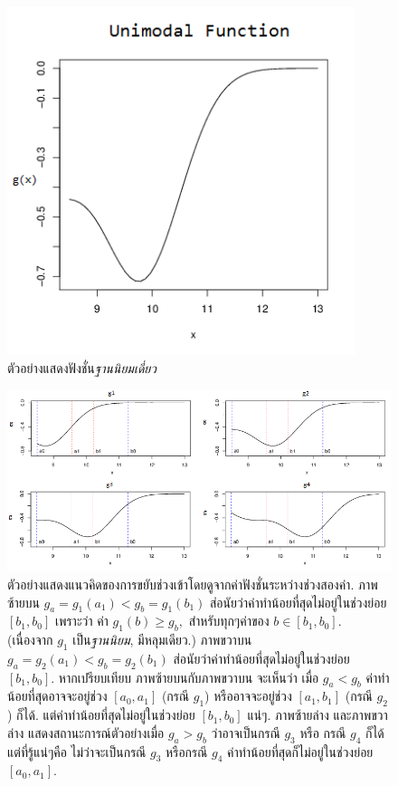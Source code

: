 %
\begin{figure}
\begin{center}
\includegraphics[width=4.0in]
{02Background/unimodal.png}
\end{center}
\caption{ตัวอย่างแสดงฟังชั่น\textit{ฐานนิยมเดี่ยว}}
\label{fig: unimodal}
\end{figure}
%

%
\begin{figure}
\begin{center}
\includegraphics[width=6.0in]
{02Background/goldenSectionIdea.png}
\end{center}
\caption{ตัวอย่างแสดงแนวคิดของการขยับช่วงเข้าโดยดูจากค่าฟังชั่นระหว่างช่วงสองค่า.
ภาพซ้ายบน $g_a=g_1(a_1) < g_b=g_1(b_1)$ ส่อนัยว่าค่าทำน้อยที่สุดไม่อยู่ในช่วงย่อย $[b_1, b_0]$
เพราะว่า ค่า $g_1(b) \geq g_b,$ สำหรับทุกๆค่าของ $b \in [b_1, b_0]$. (เนื่องจาก $g_1$ เป็น\textit{ฐานนิยม}, มีหลุมเดียว.)
ภาพขวาบน $g_a=g_2(a_1) < g_b=g_2(b_1)$ ส่อนัยว่าค่าทำน้อยที่สุดไม่อยู่ในช่วงย่อย $[b_1, b_0]$.
หากเปรียบเทียบ ภาพซ้ายบนกับภาพขวาบน จะเห็นว่า เมื่อ $g_a < g_b$ ค่าทำน้อยที่สุดอาจจะอยู่ช่วง $[a_0, a_1]$ (กรณี $g_1$) หรืออาจจะอยู่ช่วง $[a_1, b_1]$ (กรณี $g_2$) ก็ได้.
แต่ค่าทำน้อยที่สุดไม่อยู่ในช่วงย่อย $[b_1, b_0]$ แน่ๆ.
ภาพซ้ายล่าง และภาพขวาล่าง แสดงสถานะการณ์ตัวอย่างเมื่อ $g_a > g_b$ ว่าอาจเป็นกรณี $g_3$ หรือ กรณี $g_4$ ก็ได้ แต่ที่รู้แน่ๆคือ ไม่ว่าจะเป็นกรณี $g_3$ หรือกรณี $g_4$ ค่าทำน้อยที่สุดก็ไม่อยู่ในช่วงย่อย $[a_0, a_1]$.
}
\label{fig: golden section idea}
\end{figure}
%

